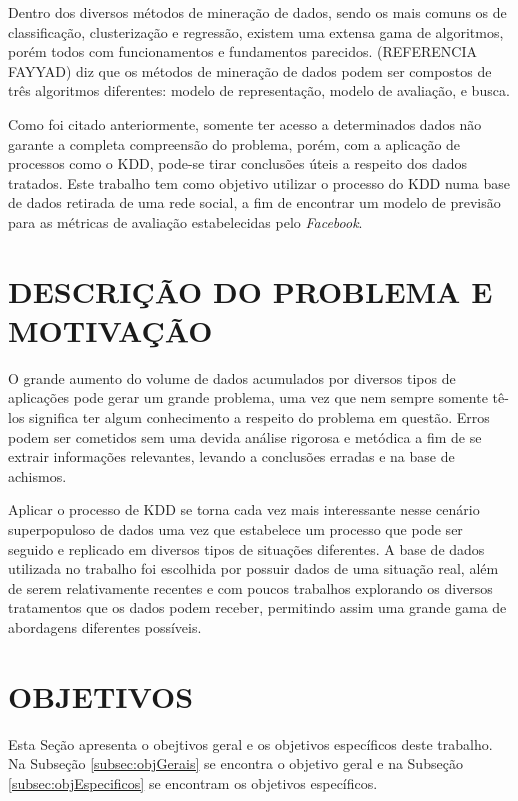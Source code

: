 Dentro dos diversos métodos de mineração de dados, sendo os mais comuns os de classificação, clusterização e regressão, existem uma extensa gama de algoritmos, porém todos com funcionamentos e fundamentos parecidos. (REFERENCIA FAYYAD) diz que os métodos de mineração de dados podem ser compostos de três algoritmos diferentes: modelo de representação, modelo de avaliação, e busca.
	
Como foi citado anteriormente, somente ter acesso a determinados dados não garante a completa compreensão do problema, porém, com a aplicação de processos como o KDD, pode-se tirar conclusões úteis a respeito dos dados tratados. Este trabalho tem como objetivo utilizar o processo do KDD numa base de dados retirada de uma rede social, a fim de encontrar um modelo de previsão para as métricas de avaliação estabelecidas pelo \textit{Facebook}.

\section{DESCRIÇÃO DO PROBLEMA E MOTIVAÇÃO}
\label{sec:descricaomotivacao}

O grande aumento do volume de dados acumulados por diversos tipos de aplicações pode gerar um grande problema, uma vez que nem sempre somente tê-los significa ter algum conhecimento a respeito do problema em questão. Erros podem ser cometidos sem uma devida análise rigorosa e metódica a fim de se extrair informações relevantes, levando a conclusões erradas e na base de achismos.

Aplicar o processo de KDD se torna cada vez mais interessante nesse cenário superpopuloso de dados uma vez que estabelece um processo que pode ser seguido e replicado em diversos tipos de situações diferentes. A base de dados utilizada no trabalho foi escolhida por possuir dados de uma situação real, além de serem relativamente recentes e com poucos trabalhos explorando os diversos tratamentos que os dados podem receber, permitindo assim uma grande gama de abordagens diferentes possíveis.

\section{OBJETIVOS}
\label{sec:objetivos}
Esta Seção apresenta o obejtivos geral e os objetivos específicos deste trabalho. Na Subseção \ref{subsec:objGerais} se encontra o objetivo geral e na Subseção \ref{subsec:objEspecificos} se encontram os objetivos específicos.

